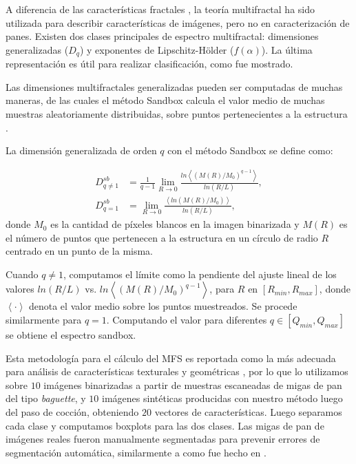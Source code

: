 A diferencia de las características fractales \cite{Gonzales2008}, la teoría multifractal ha sido utilizada para describir características de imágenes, pero no en caracterización de panes.
Existen dos clases principales de espectro multifractal: dimensiones generalizadas ($D_{q}$) y exponentes de Lipschitz-H\"older ($f(\alpha)$). 
La última representación es útil para realizar clasificación, como fue mostrado.

Las dimensiones multifractales generalizadas pueden ser computadas de muchas maneras, de las cuales el método Sandbox \cite{Tel1989} calcula el valor medio de muchas muestras aleatoriamente distribuidas, sobre puntos pertenecientes a la estructura \cite{Debartolo2004}. 

La dimensión generalizada de orden $q$ con el método Sandbox se define como:

 \begin{align*}
D_{q\ne 1}^{sb} &= \frac{1}{q-1} \lim_{R \rightarrow 0}{
\frac{ln   { \left\langle  (M(R)/M_{0})^{q-1} \right\rangle   }}
{ln {(R/L)}       }},\\
D_{q=1}^{sb} &= \lim_{R \rightarrow 0}{
\frac{ \left\langle ln   { (M(R)/M_{0})  }  \right\rangle}
{ln {(R/L)}       }},
\end{align*}
%
donde $M_{0}$ es la cantidad de píxeles blancos en la imagen binarizada y $M(R)$ es el número de puntos que pertenecen a la estructura en un círculo de radio $R$ centrado en un punto de la misma.

Cuando $q\ne1$, computamos el límite como la pendiente del ajuste lineal de los valores $ln(R/L)$ vs. $ ln  \left\langle  { (M(R)/M_{0})^{q-1} }  \right\rangle$, para $R$ en $[R_{min}, R_{max}]$, donde $ \left\langle \cdot  \right\rangle$ denota el valor medio sobre los puntos muestreados.
Se procede similarmente para $q=1$. 
Computando el valor para diferentes $q \in [Q_{min},Q_{max}]$  se obtiene el espectro sandbox.

Esta metodología para el cálculo del MFS es reportada como la más adecuada para análisis de características texturales y geométricas \cite{Gonzales2008}, por lo que lo utilizamos sobre $10$ imágenes binarizadas a partir de muestras escaneadas de migas de pan del tipo {\em baguette}, y $10$ imágenes sintéticas producidas con nuestro método luego del paso de cocción, obteniendo $20$ vectores de características.
Luego separamos cada clase y computamos boxplots para las dos clases.
Las migas de pan de imágenes reales fueron manualmente segmentadas para prevenir errores de segmentación automática, similarmente a como fue hecho en \cite{Bosch2011}.

